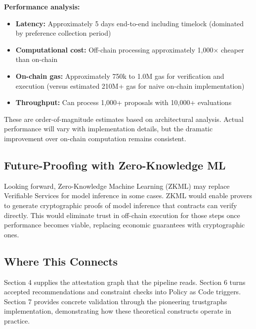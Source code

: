 \textbf{Performance analysis:}
\begin{itemize}
\item \textbf{Latency:} Approximately 5 days end-to-end including timelock (dominated by preference collection period)
\item \textbf{Computational cost:} Off-chain processing approximately 1,000× cheaper than on-chain
\item \textbf{On-chain gas:} Approximately 750k to 1.0M gas for verification and execution (versus estimated 210M+ gas for naive on-chain implementation)
\item \textbf{Throughput:} Can process 1,000+ proposals with 10,000+ evaluations
\end{itemize}

These are order-of-magnitude estimates based on architectural analysis. Actual performance will vary with implementation details, but the dramatic improvement over on-chain computation remains consistent.

\subsection{Future-Proofing with Zero-Knowledge ML}

Looking forward, Zero-Knowledge Machine Learning (ZKML) may replace Verifiable Services for model inference in some cases. ZKML would enable provers to generate cryptographic proofs of model inference that contracts can verify directly. This would eliminate trust in off-chain execution for those steps once performance becomes viable, replacing economic guarantees with cryptographic ones.

\subsection{Where This Connects}

Section 4 supplies the attestation graph that the pipeline reads. Section 6 turns accepted recommendations and constraint checks into Policy as Code triggers. Section 7 provides concrete validation through the pioneering trustgraphs implementation, demonstrating how these theoretical constructs operate in practice.

